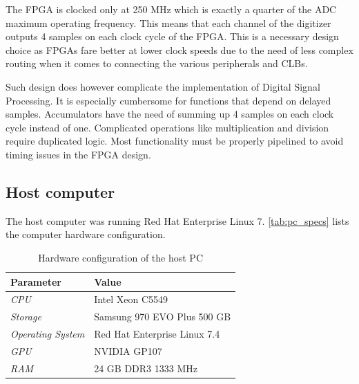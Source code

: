 The FPGA is clocked only at 250 MHz which is exactly a quarter of 
the ADC maximum operating frequency. This means that each channel
of the digitizer outputs 4 samples on each clock cycle of the 
FPGA. This is a necessary design choice as FPGAs fare better 
at lower clock speeds due to the need of less complex routing
when it comes to connecting the various peripherals and CLBs.


Such design does however complicate the implementation of 
Digital Signal Processing. It is especially cumbersome for 
functions that depend on delayed samples.
Accumulators have the need of summing up 4 samples on
each clock cycle instead of one. Complicated operations
like multiplication and division require duplicated logic.
Most functionality must be properly pipelined to avoid
timing issues in the FPGA design.

\subsection{Host computer}

The host computer was running Red Hat Enterprise Linux 7.
\autoref{tab:pc_specs} lists the computer hardware configuration.
\begin{table}[H]
\caption{Hardware configuration of the host PC}
\centering
  \begin{tabular}{l | l}
  {\bfseries Parameter} & {\bfseries Value}\\
  \hline
  \textit {CPU}             & Intel Xeon C5549 \\ \hline
  \textit {Storage}  & Samsung 970 EVO Plus 500 GB \\ \hline
  \textit {Operating System}   & Red Hat Enterprise Linux 7.4\\ \hline
  \textit {GPU}         & NVIDIA GP107 \\ \hline
  \textit {RAM}      & 24 GB DDR3 1333 MHz\\ 
  \end{tabular}
  \label{tab:pc_specs}
\end{table}


